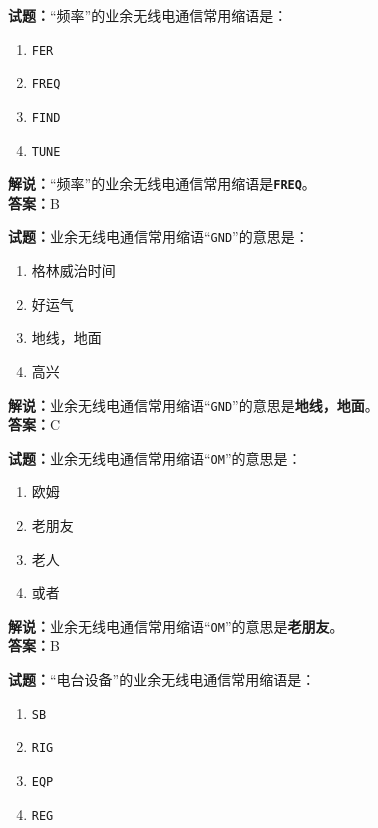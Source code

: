 \documentclass{ctexbook}
\begin{document}
\vspace{\baselineskip}

\noindent\textbf{试题：}“频率”的业余无线电通信常用缩语是：
\begin{enumerate}[leftmargin=3em]
  \item \texttt{FER}
  \item \texttt{FREQ}
  \item \texttt{FIND}
  \item \texttt{TUNE}
\end{enumerate}

\noindent\textbf{解说：}“频率”的业余无线电通信常用缩语是\texttt{\textbf{FREQ}}。\\\noindent\textbf{答案：}B

\vspace{\baselineskip}

\noindent\textbf{试题：}业余无线电通信常用缩语“\texttt{GND}”的意思是：

\begin{enumerate}[leftmargin=3em]
  \item 格林威治时间
  \item 好运气
  \item 地线，地面
  \item 高兴
\end{enumerate}

\noindent\textbf{解说：}业余无线电通信常用缩语“\texttt{GND}”的意思是\textbf{地线，地面}。\\\noindent\textbf{答案：}C

\vspace{\baselineskip}

\noindent\textbf{试题：}业余无线电通信常用缩语“\texttt{OM}”的意思是：

\begin{enumerate}[leftmargin=3em]
  \item 欧姆
  \item 老朋友
  \item 老人
  \item 或者
\end{enumerate}

\noindent\textbf{解说：}业余无线电通信常用缩语“\texttt{OM}”的意思是\textbf{老朋友}。\\\noindent\textbf{答案：}B

\vspace{\baselineskip}

\noindent\textbf{试题：}“电台设备”的业余无线电通信常用缩语是：

\begin{enumerate}[leftmargin=3em]
  \item \texttt{SB}
  \item \texttt{RIG}
  \item \texttt{EQP}
  \item \texttt{REG}
\end{enumerate}
\end{document}
